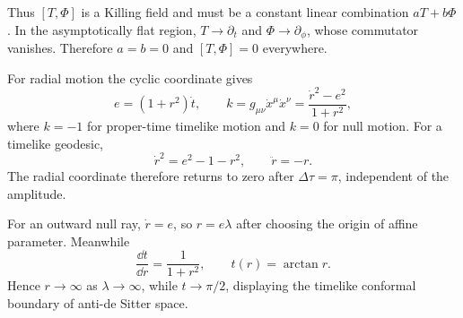 \begin{solutions}
\begin{solution}
Thus \([T,\Phi]\) is a Killing field and must be a constant linear
combination \(aT+b\Phi\).  In the asymptotically flat region,
\(T\to\partial_t\) and \(\Phi\to\partial_\phi\), whose commutator vanishes.
Therefore \(a=b=0\) and \([T,\Phi]=0\) everywhere.
\end{solution}

\begin{solution}
For radial motion the cyclic coordinate gives
\[
e=(1+r^2)\dot t,
\qquad
k=g_{\mu\nu}\dot x^\mu\dot x^\nu
=\frac{\dot r^2-e^2}{1+r^2},
\]
where \(k=-1\) for proper-time timelike motion and \(k=0\) for null motion.
For a timelike geodesic,
\[
\dot r^2=e^2-1-r^2,\qquad \ddot r=-r.
\]
The radial coordinate therefore returns to zero after
\(\Delta\tau=\pi\), independent of the amplitude.

For an outward null ray, \(\dot r=e\), so \(r=e\lambda\) after choosing the
origin of affine parameter.  Meanwhile
\[
\frac{\dd t}{\dd r}=\frac1{1+r^2},
\qquad
t(r)=\arctan r.
\]
Hence \(r\to\infty\) as \(\lambda\to\infty\), while
\(t\to\pi/2\), displaying the timelike conformal boundary of anti-de Sitter
space.
\end{solution}



\end{solutions}

